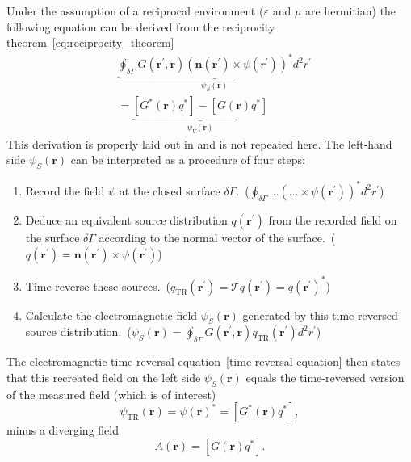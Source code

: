 Under the assumption of a reciprocal environment (\(\varepsilon \) and \(\mu \) are hermitian) the following equation can be derived from the reciprocity theorem~\eqref{eq:reciprocity_theorem}
\begin{equation}\label{time-reversal-equation}
    \begin{aligned}
    & \underbrace{\oint_{\delta \Gamma} G(\bm{r}^{\prime}, \bm{r}) {\left(\bm{n}\left(\bm{r}^{\prime}\right) \times  \psi(r^{\prime}) \right)}^* d^2 r^{\prime}}_{\psi_S(\bm{r})} \\
    &=\underbrace{[G^*(\bm{r}) q^*] - [G(\bm{r}) q^*]}_{\psi_V(\bm{r})}
    \end{aligned}
\end{equation}
This derivation is properly laid out  in \parencite{de_rosny_theory_2010} and is not repeated here.
The left-hand side \(\psi_S(\bm{r})\) can be interpreted as a procedure of four steps:
\begin{enumerate}
    \item Record the field \(\psi \) at the closed surface \(\delta \Gamma \).\ (\(\oint_{\delta \Gamma} \ldots  {(\ldots \times \psi(\bm{r}^{\prime}))}^* d^2 r^{\prime}\))
    \item Deduce an equivalent source distribution \(q(\bm{r}^{\prime})\) from the recorded field on the surface \(\delta \Gamma \) according to the normal vector of the surface.\ (\(q(\bm{r}^{\prime}) = \bm{n}(\bm{r}^{\prime}) \times \psi(\bm{r}^{\prime})\))
    \item Time-reverse these sources.\ (\(q_{\text{TR}}(\bm{r}^{\prime}) = \mathcal{T}q(\bm{r}^{\prime}) = {q(\bm{r}^{\prime})}^*\))
    \item Calculate the electromagnetic field \(\psi_S(\bm{r})\) generated by this time-reversed source distribution.\ (\(\psi_S(\bm{r}) = \oint_{\delta \Gamma} G(\bm{r}^{\prime}, \bm{r}) q_{\text{TR}}(\bm{r}^{\prime}) d^2 r^{\prime}\))
\end{enumerate}
The electromagnetic time-reversal equation~\eqref{time-reversal-equation} then states that this recreated field on the left side \(\psi_S(\bm{r})\) equals the time-reversed version of the measured field (which is of interest)
\begin{equation}
    \psi_{\text{TR}}(\bm{r}) = \psi{(\bm{r})}^* = [G^*(\bm{r}) q^*],
\end{equation}
minus a diverging field
\begin{equation}
    A(\bm{r}) = [G(\bm{r}) q^*].
\end{equation}

